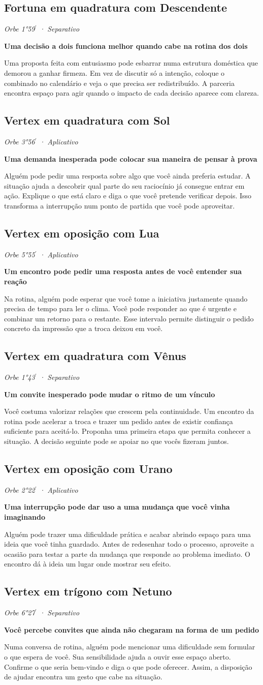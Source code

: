 \documentclass[11pt,a4paper]{article}
\newcommand{\leitura}[3]{\subsection{#1}\textit{#2}\par #3}
\newcommand{\subtituloleitura}[1]{\textbf{#1}\par\nopagebreak[4]}
\begin{document}
\leitura{Fortuna em quadratura com Descendente}{Orbe 1°59\ensuremath{^{\prime}} · Separativo}{
\subtituloleitura{Uma decisão a dois funciona melhor quando cabe na rotina dos dois}
Uma proposta feita com entusiasmo pode esbarrar numa estrutura doméstica que demorou a ganhar firmeza. Em vez de discutir só a intenção, coloque o combinado no calendário e veja o que precisa ser redistribuído. A parceria encontra espaço para agir quando o impacto de cada decisão aparece com clareza.
}

\leitura{Vertex em quadratura com Sol}{Orbe 3°56\ensuremath{^{\prime}} · Aplicativo}{
\subtituloleitura{Uma demanda inesperada pode colocar sua maneira de pensar à prova}
Alguém pode pedir uma resposta sobre algo que você ainda preferia estudar. A situação ajuda a descobrir qual parte do seu raciocínio já consegue entrar em ação. Explique o que está claro e diga o que você pretende verificar depois. Isso transforma a interrupção num ponto de partida que você pode aproveitar.
}

\leitura{Vertex em oposição com Lua}{Orbe 5°55\ensuremath{^{\prime}} · Aplicativo}{
\subtituloleitura{Um encontro pode pedir uma resposta antes de você entender sua reação}
Na rotina, alguém pode esperar que você tome a iniciativa justamente quando precisa de tempo para ler o clima. Você pode responder ao que é urgente e combinar um retorno para o restante. Esse intervalo permite distinguir o pedido concreto da impressão que a troca deixou em você.
}

\leitura{Vertex em quadratura com Vênus}{Orbe 1°43\ensuremath{^{\prime}} · Separativo}{
\subtituloleitura{Um convite inesperado pode mudar o ritmo de um vínculo}
Você costuma valorizar relações que crescem pela continuidade. Um encontro da rotina pode acelerar a troca e trazer um pedido antes de existir confiança suficiente para aceitá-lo. Proponha uma primeira etapa que permita conhecer a situação. A decisão seguinte pode se apoiar no que vocês fizeram juntos.
}

\leitura{Vertex em oposição com Urano}{Orbe 2°22\ensuremath{^{\prime}} · Aplicativo}{
\subtituloleitura{Uma interrupção pode dar uso a uma mudança que você vinha imaginando}
Alguém pode trazer uma dificuldade prática e acabar abrindo espaço para uma ideia que você tinha guardado. Antes de redesenhar todo o processo, aproveite a ocasião para testar a parte da mudança que responde ao problema imediato. O encontro dá à ideia um lugar onde mostrar seu efeito.
}

\leitura{Vertex em trígono com Netuno}{Orbe 6°27\ensuremath{^{\prime}} · Separativo}{
\subtituloleitura{Você percebe convites que ainda não chegaram na forma de um pedido}
Numa conversa de rotina, alguém pode mencionar uma dificuldade sem formular o que espera de você. Sua sensibilidade ajuda a ouvir esse espaço aberto. Confirme o que seria bem-vindo e diga o que pode oferecer. Assim, a disposição de ajudar encontra um gesto que cabe na situação.
}
\end{document}
